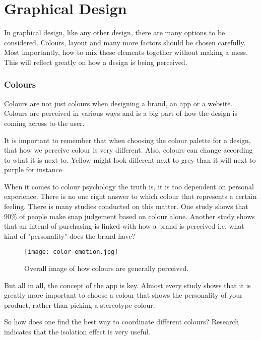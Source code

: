 \section{Graphical Design}
In graphical design, like any other design, there are many options to be considered. Colours, layout and many more factors should be chosen carefully. Most importantly, how to mix these elements together without making a mess. 
This will reflect greatly on how a design is being perceived. \cite{ColorMeaning}

\subsubsection{Colours}

Colours are not just colours when designing a brand, an app or a website. Colours are perceived in various ways and is a big part of how the design is coming  across to the user. \cite{ColorMeaning}

It is important to remember that when choosing the colour palette for a design, that how we perceive colour is very different. Also, colours can change according to what it is next to. Yellow might look different next to grey than it will next to purple for instance. \cite{Colour}

When it comes to colour psychology the truth is, it is too dependent on personal experience. There is no one right answer to which colour that represents a certain feeling. \cite{ColorMeaning}
There is many studies conducted on this matter. 
One study shows that 90\% of people make snap judgement based on colour alone. \cite{ColorMeaning} Another study shows that an intend of purchasing is linked with how a brand is perceived i.e. what kind of "personality" does the brand have?\cite{ColorMeaning}

\begin{figure}[H]
\centering
\texttt{[image: color-emotion.jpg]}
\caption{Overall image of how colours are generally perceived.} \cite{ColorMeaning}
\end{figure}

But all in all, the concept of the app is key. Almost every study shows that it is greatly more important to choose a colour that shows the personality of your product, rather than picking a stereotype colour. \cite{ColorMeaning}

So how does one find the best way to coordinate different colours? Research indicates that the isolation effect is very useful.

